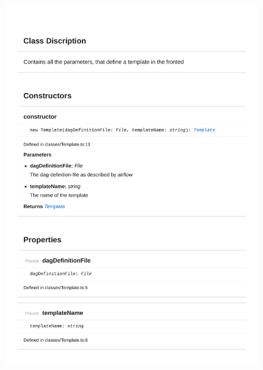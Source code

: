 \begin{figure}[H]
\centerline{\includegraphics[width=\textwidth]{FrontendDocsAsPDF/Classes/Template.pdf}}
\end{figure}

